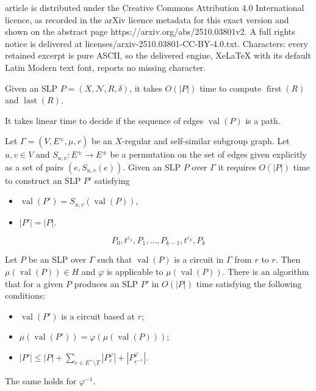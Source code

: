 \documentclass[10pt,a4paper]{amsart}
\DeclareMathOperator{\first}{{first}}
\DeclareMathOperator{\last}{{last}}
\DeclareMathOperator{\val}{val}
\def\CN{{\mathcal N}}
\begin{document}
article is distributed under the Creative Commons Attribution 4.0 International licence, as recorded in the arXiv licence metadata for this exact version and shown on the abstract page https://arxiv.org/abs/2510.03801v2. A full rights notice is delivered at licenses/arxiv-2510.03801-CC-BY-4.0.txt. Characters: every retained excerpt is pure ASCII, so the delivered engine, XeLaTeX with its default Latin Modern text font, reports no missing character.
\begin{lemma}\label{le:first-last}
Given an SLP $P=(X,\CN,R,\delta)$, it takes $O(|P|)$ time to compute
$\first(R)$ and $\last(R)$.
\end{lemma}

\begin{lemma}\label{le:SLP-connected}
It takes linear time to decide if the sequence of edges $\val(P)$
is a path.
\end{lemma}

\begin{proposition}\label{pr:Suv-SLP}
Let $\Gamma=(V,E^\pm,\mu,r)$ be an $X$-regular 
and self-similar subgroup graph.
Let $u,v\in V$ and $S_{u,v}:E^\pm\to E^\pm$ be a 
permutation on the set of edges given explicitly
as a set of pairs $(e,S_{u,v}(e))$.
Given an SLP $P$ over $\Gamma$ 
it requires $O(|P|)$ time to construct an SLP $P'$
satisfying
\begin{itemize}
\item 
$\val(P')=S_{u,v}(\val(P))$,
\item 
$|P'|=|P|$.
\end{itemize}
\end{proposition}

\begin{equation}\label{eq:slp-word}
P_0, t^{\varepsilon_1},
P_1, \dots,
P_{k-1}, t^{\varepsilon_k},P_k
\end{equation}

\begin{proposition}\label{pr:apply-phi}
Let $P$ be an SLP over $\Gamma$ such that $\val(P)$ is a 
circuit in $\Gamma$ from $r$ to $r$.
Then $\mu(\val(P)) \in H$ and $\varphi$ is applicable to
$\mu(\val(P))$. 
There is an algorithm that
for a given $P$ produces an SLP $P'$ in $O(|P|)$ time
satisfying the following conditions:
\begin{itemize}
\item[(a)]
$\val(P')$ is a circuit based at $r$;
\item[(b)]
$\mu(\val(P')) = \varphi(\mu(\val(P)))$;
\item[(c)]
$|P'|\le |P| + \sum_{e\in E^+\setminus T}
|P_e^\varphi|+
|P_{e^{-1}}^\varphi|$.
\end{itemize}
The same holds for $\varphi^{-1}$.
\end{proposition}
\end{document}
